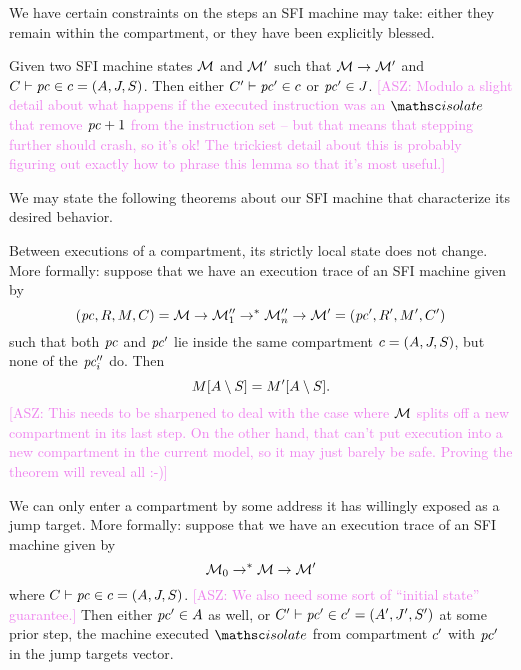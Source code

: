 \documentclass[12pt]{amsart}
\newif\ifdraft\drafttrue
\newcommand{\asz}[1]{\ifdraft\textcolor{violet}{[ASZ: #1]}\fi}
\begin{document}
We have certain constraints on the steps an SFI machine may take: either they
remain within the compartment, or they have been explicitly blessed.

\begin{lemma}\label{lem:permitted-steps}
  Given two SFI machine states $\mathcal{M}$ and $\mathcal{M}'$ such that $\mathcal{M}
  \to \mathcal{M}'$ and $C \vdash \mathit{pc} \in c =
  (A, J, S)$.  Then either $C'
  \vdash \mathit{pc}' \in c$ or $\mathit{pc}' \in J$.  \asz{Modulo a
    slight detail about what happens if the executed instruction was an
    $\opcode{isolate}$ that remove $\mathit{pc}+1$ from the instruction set -- but that
    means that stepping further should crash, so it's ok!  The trickiest detail
    about this is probably figuring out exactly how to phrase this lemma so that
    it's most useful.}
\end{lemma}

We may state the following theorems about our SFI machine that characterize its
desired behavior.

\begin{theorem}\label{thm:mutual-independence}
  Between executions of a compartment, its strictly local state does not change.
  More formally: suppose that we have an execution trace of an SFI machine given
  by \[ (\mathit{pc},R,M,C) = \mathcal{M} \to \mathcal{M}''_1
  \to^* \mathcal{M}''_n \to \mathcal{M}' =
  (\mathit{pc}',R',M',C') \] such that both $\mathit{pc}$ and $\mathit{pc}'$
  lie inside the same compartment $c =
  (A,J,S)$, but none of the $\mathit{pc}''_i$ do.
  Then \[ M[A \setminus S] =
  M'[A \setminus S]. \]%
  \asz{This needs to be sharpened to deal with the case where $\mathcal{M}$ splits
    off a new compartment in its last step.  On the other hand, that can't put
    execution into a new compartment in the current model, so it may just barely
    be safe.  Proving the theorem will reveal all :-)}
\end{theorem}

\begin{theorem}\label{thm:entry-points}
  We can only enter a compartment by some address it has willingly exposed as a
  jump target.  More formally: suppose that we have an execution trace of an SFI
  machine given by \[ \mathcal{M}_0 \to^* \mathcal{M} \to \mathcal{M}' \] where
  $C \vdash \mathit{pc} \in c = (A, J,
  S)$.  \asz{We also need some sort of ``initial state'' guarantee.}
  Then either $\mathit{pc}' \in A$ as well, or $C' \vdash \mathit{pc}'
  \in c' = (A', J', S')$ at some
  prior step, the machine executed $\opcode{isolate}$ from compartment
  $c'$ with $\mathit{pc}'$ in the jump targets vector.
\end{theorem}
\end{document}
